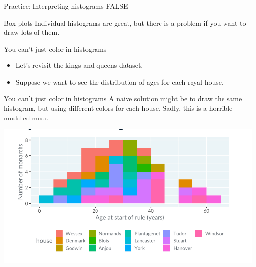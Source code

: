 \documentclass[
  ignorenonframetext,
]{beamer}
\begin{document}
\begin{frame}{Practice: Interpreting histograms}
\label{practice-interpreting-histograms-12}
FALSE
\end{frame}

\begin{frame}{Box plots}
\label{box-plots}
Individual histograms are great, but there is a problem if you want to
draw lots of them.
\end{frame}

\begin{frame}{You can't just color in histograms}
\label{you-cant-just-color-in-histograms}
\begin{itemize}
\item
  Let's revisit the kings and queens dataset.
\item
  Suppose we want to see the distribution of ages for each royal house.
\end{itemize}
\end{frame}

\begin{frame}{You can't just color in histograms}
\label{you-cant-just-color-in-histograms-1}
A naive solution might be to draw the same histogram, but using
different colors for each house. Sadly, this is a horrible muddled mess.

\includegraphics{../images/im17.png}
\end{frame}
\end{document}
